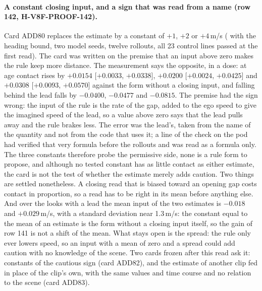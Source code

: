 \paragraph{A constant closing input, and a sign that was read from a name (row 142, H-V8F-PROOF-142).} Card ADD80 replaces the estimate by a constant of $+1$, $+2$ or $+4$\,m/s ( with the heading bound, two model seeds, twelve rollouts, all 23 control lines passed at the first read). The card was written on the premise that an input above zero makes the rule keep more distance. The measurement says the opposite, in a dose: at age contact rises by $+0.0154$ [$+0.0033$, $+0.0338$], $+0.0200$ [$+0.0024$, $+0.0425$] and $+0.0308$ [$+0.0093$, $+0.0570$] against the form without a closing input, and falling behind the lead falls by $-0.0400$, $-0.0477$ and $-0.0815$. The premise had the sign wrong: the input of the rule is the rate of the gap, added to the ego speed to give the imagined speed of the lead, so a value above zero says that the lead pulls away and the rule brakes less. The error was the lead's, taken from the name of the quantity and not from the code that uses it; a line of the check on the pod had verified that very formula before the rollouts and was read as a formula only. The three constants therefore probe the permissive side, none is a rule form to propose, and although no tested constant has as little contact as either estimate, the card is not the test of whether the estimate merely adds caution. Two things are settled nonetheless. A closing read that is biased toward an opening gap costs contact in proportion, so a read has to be right in its mean before anything else. And over the looks with a lead the mean input of the two estimates is $-0.018$ and $+0.029$\,m/s, with a standard deviation near 1.3\,m/s: the constant equal to the mean of an estimate is the form without a closing input itself, so the gain of row 141 is not a shift of the mean. What stays open is the spread: the rule only ever lowers speed, so an input with a mean of zero and a spread could add caution with no knowledge of the scene. Two cards frozen after this read ask it: constants of the cautious sign (card ADD82), and the estimate of another clip fed in place of the clip's own, with the same values and time course and no relation to the scene (card ADD83).

